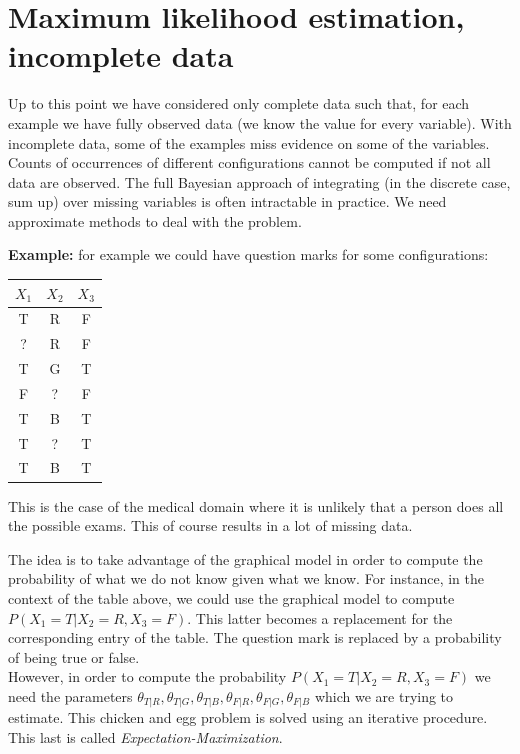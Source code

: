 \section{Maximum likelihood estimation, incomplete data}
Up to this point we have considered only complete data such that, for each example we have fully observed data (we know the value for every variable). With incomplete data, some of the examples miss evidence on some of the variables. Counts of occurrences of different configurations cannot be computed if not all data are observed. The full Bayesian approach of integrating (in the discrete case, sum up) over missing variables is often intractable in practice. We need approximate methods to deal with the problem. \newline

\textbf{Example:} for example we could have question marks for some configurations:
\begin{center}
\begin{tabular}{ |c|c|c| } 
 $X_1$ & $X_2$ & $X_3$ \\
 \hline
 T & R & F \\ 
 ? & R & F \\ 
 T & G & T \\ 
 F & ? & F \\ 
 T & B & T \\ 
 T & ? & T \\
 T & B  & T \\ 
\end{tabular}
\end{center}
This is the case of the medical domain where it is unlikely that a person does all the possible exams. This of course results in a lot of missing data. \newline

The idea is to take advantage of the graphical model in order to compute the probability of what we do not know given what we know. For instance, in the context of the table above, we could use the graphical model to compute $P(X_1=T | X_2=R, X_3=F)$. This latter becomes a replacement for the corresponding entry of the table. The question mark is replaced by a probability of being true or false. \\
However, in order to compute the probability $P(X_1=T | X_2=R, X_3=F)$ we need the parameters $\theta_{T|R}, \theta_{T|G}, \theta_{T|B} ,\theta_{F|R}, \theta_{F|G}, \theta_{F|B}$ which we are trying to estimate. This chicken and egg problem is solved using an iterative procedure. This last is called \textit{Expectation-Maximization}.

